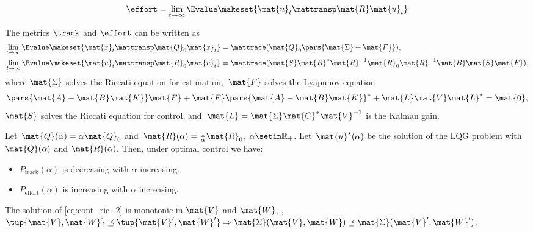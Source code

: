 {\begin{forslides}
    \begin{equation}
        \label{eq:peffort}
        \effort=\lim_{t\to \infty}\Evalue\makeset{\mat{u}_t\mattransp \mat{R} \mat{u}_t }
    \end{equation}

    \begin{lemma}
        \label{lem:precision}
        The metrics $\track$ and $\effort$ can be written as
        \begin{equation}
            \begin{aligned}
                \lim_{t\to \infty}\Evalue\makeset{ \mat{x}_t\mattransp \mat{Q}_0\mat{x}_t} & =\mattrace(\mat{Q}_0\pars{ \mat{\Sigma} +\mat{F}}), \\
                \lim_{t\to \infty}\Evalue\makeset{ \mat{u}_t\mattransp \mat{R}_0\mat{u}_t} & =\mattrace(\mat{S}\mat{B}^*\mat{R}^{-1}\mat{R}_0\mat{R}^{-1}\mat{B}\mat{S}\mat{F}),
            \end{aligned}
        \end{equation}
        where
        $\mat{\Sigma}$ solves the Riccati equation for estimation,~$\mat{F}$ solves the Lyapunov equation
        \begin{equation}
            \label{eq:lyapct}
            \pars{ \mat{A}-\mat{B}\mat{K}}\mat{F}+\mat{F}\pars{\mat{A}-\mat{B}\mat{K}}^*+\mat{L}\mat{V}\mat{L}^*=\mat{0},
        \end{equation}
        $\mat{S}$ solves the Riccati equation for control, and~$\mat{L}=\mat{\Sigma}\mat{C}^*\mat{V}^{-1}$ is the Kalman gain.
    \end{lemma}

    \begin{lemma}
        \label{lem:codesigncnt_1}
        Let~$\mat{Q}(\alpha)=\alpha \mat{Q}_0$ and~$\mat{R}(\alpha)=\frac{1}{\alpha}\mat{R}_0$, $\alpha\setin \mathbb{R}_+$.
        Let~$\mat{u}^\star(\alpha)$ be the solution of the LQG problem with $\mat{Q}(\alpha)$ and $\mat{R}(\alpha)$.
        Then, under optimal control we have:
        \begin{itemize}
            \item $P_\mathrm{track}(\alpha)$ is decreasing with $\alpha$
                  increasing.
            \item $P_\mathrm{effort}(\alpha)$ is increasing with $\alpha$ increasing.
        \end{itemize}
    \end{lemma}

    \begin{lemma}
        \label{lem:cont_V_W}
        The solution of \cref{eq:cont_ric_2} is monotonic in $\mat{V}$ and $\mat{W}$, \ie, $\tup{\mat{V},\mat{W}}\preceq \tup{\mat{V}',\mat{W}'} \Rightarrow \mat{\Sigma}(\mat{V},\mat{W})\preceq \mat{\Sigma}(\mat{V}',\mat{W}')$.
    \end{lemma}


\end{forslides}}
